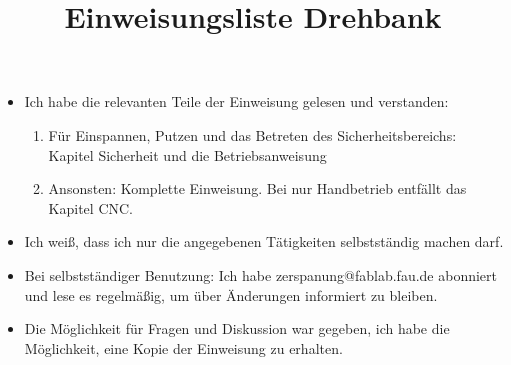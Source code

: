 \documentclass[landscape]{\basedir/fablab-document}
\title{Einweisungsliste Drehbank}
\def\tabularnewcol{&\xspace} %
\begin{document}
\setlength{\itemsep}{0em}
\begin{itemize}
\item Ich habe die relevanten Teile der Einweisung gelesen und verstanden:
	\begin{enumerate}
	\item Für Einspannen, Putzen und das Betreten des Sicherheitsbereichs:  Kapitel Sicherheit und die Betriebsanweisung
	\item Ansonsten: Komplette Einweisung. Bei nur Handbetrieb entfällt das Kapitel CNC.
	\end{enumerate}
\item Ich weiß, dass ich nur die angegebenen Tätigkeiten selbstständig machen darf.
\item Bei selbstständiger Benutzung: Ich habe zerspanung@fablab.fau.de abonniert und lese es regelmäßig, um über Änderungen informiert zu bleiben.
\item Die Möglichkeit für Fragen und Diskussion war gegeben, ich habe die Möglichkeit, eine Kopie der Einweisung zu erhalten.
\end{itemize}

\newcommand{\quer}[1]{\rotatebox{90}{\textbf{#1}\hspace{1em}}}

\vspace{10em}
\hspace{2cm}
\vspace{-27em}

\setcounter{i}{1}

\newcommand{\leerezeile}{\hspace{2em} \tabularnewcol\parbox[b]{2cm}{Datum:\\[2em]gültig bis:} \tabularnewcol \parbox{5cm}{Name:\\[2em]Einweisender:\\[2em]} \tabularnewcol  \tabularnewcol\tabularnewcol  \tabularnewcol   \tabularnewline \hline}
\end{document}
